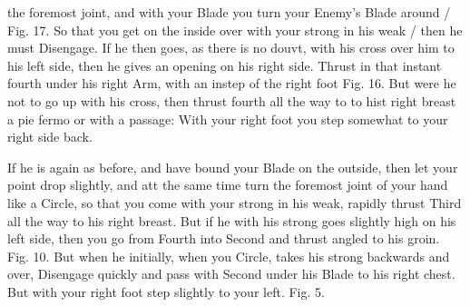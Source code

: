 \newpage


\newpage



the foremost joint, and with your Blade you turn your Enemy's Blade
around / Fig. 17. So that you get on the inside over with your strong
in his weak / then he must Disengage. If he then goes, as there is no
douvt, with his cross over him to his left side, then he gives an
opening on his right side. Thrust in that instant fourth under his
right Arm, with an instep of the right foot Fig. 16. But were he not
to go up with his cross, then thrust fourth all the way to to hist
right breast a pie fermo or with a passage: With your right foot you
step somewhat to your right side back.

\exercise{}

If he is again as before, and have bound your Blade on the outside,
then let your point drop slightly, and att the same time turn the
foremost joint of your hand like a Circle, so that you come with your
strong in his weak, rapidly thrust Third all the way to his right
breast. But if he with his strong goes slightly high on his left side,
then you go from Fourth into Second and thrust angled to his
groin. Fig. 10. But when he initially, when you Circle, takes his
strong backwards and over, Disengage quickly and pass with Second
under his Blade to his right chest. But with your right foot step
slightly to your left. Fig. 5.

